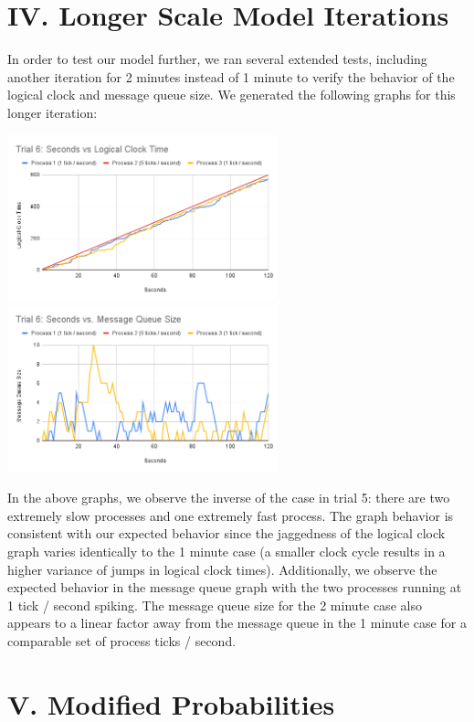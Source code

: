 \documentclass[
	a4paper, %
	10pt, %
	unnumberedsections, %
	twoside, %
]{LTJournalArticle}
\begin{document}
\section{IV. Longer Scale Model Iterations}

In order to test our model further, we ran several extended tests, including another iteration for 2 minutes instead of 1 minute to verify the behavior of the logical clock and message queue size. We generated the following graphs for this longer iteration: 

\includegraphics[width=7.8cm]{assets/t6_clock.png}
\includegraphics[width=7.8cm]{assets/t6_size.png}

In the above graphs, we observe the inverse of the case in trial 5: there are two extremely slow processes and one extremely fast process. The graph behavior is consistent with our expected behavior since the jaggedness of the logical clock graph varies identically to the 1 minute case (a smaller clock cycle results in a higher variance of jumps in logical clock times). Additionally, we observe the expected behavior in the message queue graph with the two processes running at 1 tick / second spiking. The message queue size for the 2 minute case also appears to a linear factor away from the message queue in the 1 minute case for a comparable set of process ticks / second.

\section{V. Modified Probabilities}
\end{document}

